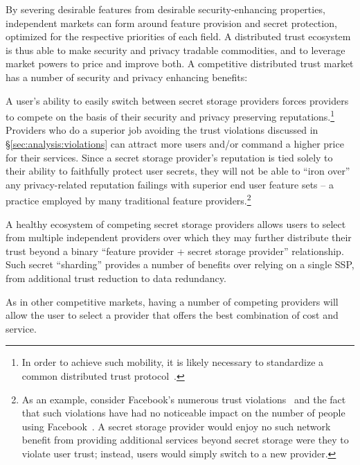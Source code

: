 By severing desirable features from desirable security-enhancing
properties, independent markets can form around feature provision and
secret protection, optimized for the respective priorities of each
field. A distributed trust ecosystem is thus able to make security and
privacy tradable commodities, and to leverage market powers to price
and improve both. A competitive distributed trust market has a number
of security and privacy enhancing benefits:

\begin{packed_desc}
\item[Reputation:] A user's ability to easily switch between secret
  storage providers forces providers to compete on the basis of their
  security and privacy preserving reputations.\footnote{In order to
    achieve such mobility, it is likely necessary to standardize a
    common distributed trust protocol~\cite{sayler-phd}.} Providers
  who do a superior job avoiding the trust violations discussed in
  \S\ref{sec:analysis:violations} can attract more users and/or
  command a higher price for their services. Since a secret storage
  provider's reputation is tied solely to their ability to faithfully
  protect user secrets, they will not be able to ``iron over'' any
  privacy-related reputation failings with superior end user feature
  sets -- a practice employed by many traditional feature
  providers.\footnote{As an example, consider Facebook's numerous
    trust violations~\cite{goel2014, lomas2014, tsukayama2014} and the
    fact that such violations have had no noticeable impact on the
    number of people using Facebook~\cite{foster2014}. A secret
    storage provider would enjoy no such network benefit from
    providing additional services beyond secret storage were they to
    violate user trust; instead, users would simply switch to a new
    provider.}
\item[Multiple Providers:] A healthy ecosystem of competing secret
  storage providers allows users to select from multiple independent
  providers over which they may further distribute their trust beyond
  a binary ``feature provider + secret storage provider''
  relationship. Such secret ``sharding'' provides a number of benefits
  over relying on a single SSP, from additional trust reduction to
  data redundancy.
\item[Cost:] As in other competitive markets, having a number of
  competing providers will allow the user to select a provider that
  offers the best combination of cost and service.
\end{packed_desc}

